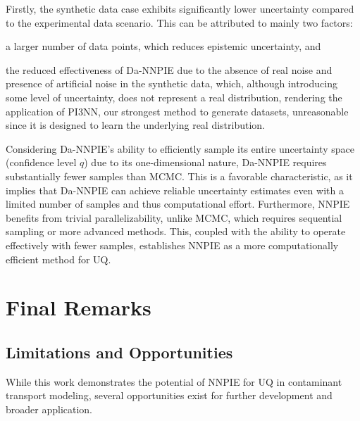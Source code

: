 Firstly, the synthetic data case exhibits significantly lower uncertainty compared to the experimental data scenario. This can be attributed to mainly two factors:
\begin{enumerate*}
    \item a larger number of data points, which reduces epistemic uncertainty, and
    \item the reduced effectiveness of Da-NNPIE due to the absence of real noise and presence of artificial noise in the synthetic data, which, although introducing some level of uncertainty, does not represent a real distribution, rendering the application of PI3NN, our strongest method to generate datasets, unreasonable since it is designed to learn the underlying real distribution.
\end{enumerate*}

Considering Da-NNPIE's ability to efficiently sample its entire uncertainty space (confidence level $q$) due to its one-dimensional nature, Da-NNPIE requires substantially fewer samples than MCMC. This is a favorable characteristic, as it implies that Da-NNPIE can achieve reliable uncertainty estimates even with a limited number of samples and thus computational effort. Furthermore, NNPIE benefits from trivial parallelizability, unlike MCMC, which requires sequential sampling or more advanced methods. This, coupled with the ability to operate effectively with fewer samples, establishes NNPIE as a more computationally efficient method for UQ.




\chapter{Final Remarks}
\label{sec:final_remarks}

\section{Limitations and Opportunities}
While this work demonstrates the potential of NNPIE for UQ in contaminant transport modeling, several opportunities exist for further development and broader application.

